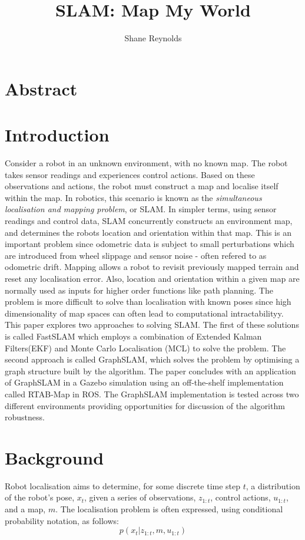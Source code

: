 \documentclass[a4paper]{article}
\begin{document}
\title{SLAM: Map My World}
\author{Shane Reynolds}
\maketitle

\section*{Abstract}

\section{Introduction}
Consider a robot in an unknown environment, with no known map. The robot takes sensor readings and experiences control actions. Based on these observations and actions, the robot must construct a map and localise itself within the map. In robotics, this scenario is known as the \textit{simultaneous localisation and mapping problem}, or SLAM. In simpler terms, using sensor readings and control data, SLAM concurrently constructs an environment map, and determines the robots location and orientation within that map. This is an important problem since odometric data is subject to small perturbations which are introduced from wheel slippage and sensor noise - often refered to as odometric drift. Mapping allows a robot to revisit previously mapped terrain and reset any localisation error. Also, location and orientation within a given map are normally used as inputs for higher order functions like path planning. The problem is more difficult to solve than localisation with known poses since high dimensionality of map spaces can often lead to computational intractabilityy. This paper explores two approaches to solving SLAM. The first of these solutions is called FastSLAM which employs a combination of Extended Kalman Filters(EKF) and Monte Carlo Localisation (MCL) to solve the problem. The second approach is called GraphSLAM, which solves the problem by optimising a graph structure built by the algorithm. The paper concludes with an application of GraphSLAM in a Gazebo simulation using an off-the-shelf implementation called RTAB-Map in ROS. The GraphSLAM implementation is tested across two different environments providing opportunities for discussion of the algorithm robustness.

\section{Background}
Robot localisation aims to determine, for some discrete time step $t$, a distribution of the robot's pose, $x_t$, given a series of observations, $z_{1:t}$, control actions, $u_{1:t}$, and a map, $m$. The localisation problem is often expressed, using conditional probability notation, as follows:
\begin{equation}
p(x_t | z_{1:t}, m, u_{1:t})
\end{equation}
\end{document}
